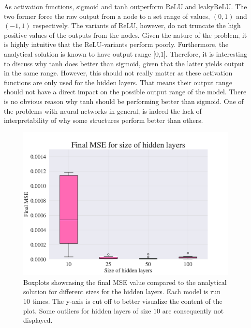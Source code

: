 
As activation functions, sigmoid and tanh outperform ReLU and leakyReLU. 
The two former force the raw output from a node to a set range of values, $(0,1)$ and $(-1,1)$ respectively. 
The variants of ReLU, however, do not truncate the high positive values of the outputs from the nodes. 
Given the nature of the problem, it is highly intuitive that the ReLU-variants perform poorly. 
Furthermore, the analytical solution is known to have output range [0,1]. 
Therefore, it is interesting to discuss why tanh does better than sigmoid, given that the latter yields output in the same range. 
However, this should not really matter as these activation functions are only used for the hidden layers.
That means their output range should not have a direct impact on the possible output range of the model.
There is no obvious reason why tanh should be performing better than sigmoid.
One of the problems with neural networks in general, is indeed the lack of interpretability of why some structures perform better than others.


\begin{figure}[h!]
    \centering
    \includegraphics[width=1.0\linewidth]{project_3/plots/value_layers_search.pdf}
    \caption{Boxplots showcasing the final MSE value compared to the analytical solution for different sizes for the hidden layers. Each model is run 10 times. The y-axis is cut off to better visualize the content of the plot. Some outliers for hidden layers of size $10$ are consequently not displayed.}
    \label{fig:boxplots_size_of_layers}
\end{figure}


